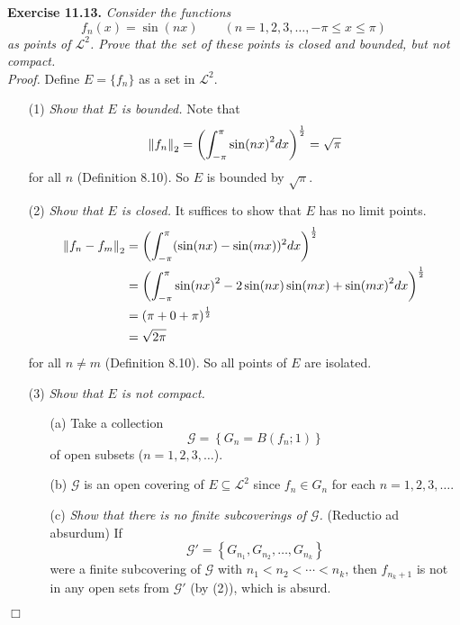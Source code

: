 \documentclass{article}
\begin{document}



\textbf{Exercise 11.13.}
\emph{Consider the functions
\[
  f_n(x) = \sin(nx)
  \qquad
  (n=1,2,3,\ldots, -\pi \leq x \leq \pi)
\]
as points of $\mathscr{L}^2$.
Prove that the set of these points is closed and bounded, but not compact.} \\


\emph{Proof.}
Define $E = \{ f_n \}$ as a set in $\mathscr{L}^2$.
\begin{enumerate}
\item[(1)]
  \emph{Show that $E$ is bounded.}
  Note that
  \[
    \norm{f_n}_2
    = \left( \int_{-\pi}^{\pi} \sin(nx)^2 dx \right)^{\frac{1}{2}}
    = \sqrt{\pi}
  \]
  for all $n$ (Definition 8.10).
  So $E$ is bounded by $\sqrt{\pi}$.

\item[(2)]
  \emph{Show that $E$ is closed.}
  It suffices to show that $E$ has no limit points.
  \begin{align*}
    \norm{f_n - f_m}_2
    &= \left( \int_{-\pi}^{\pi} (\sin(nx)-\sin(mx))^2 dx \right)^{\frac{1}{2}} \\
    &= \left( \int_{-\pi}^{\pi}
      \sin(nx)^2 - 2\sin(nx)\sin(mx) + \sin(mx)^2 dx \right)^{\frac{1}{2}} \\
    &= (\pi + 0 + \pi)^{\frac{1}{2}} \\
    &= \sqrt{2\pi}
  \end{align*}
  for all $n \neq m$ (Definition 8.10).
  So all points of $E$ are isolated.

\item[(3)]
  \emph{Show that $E$ is not compact.}
  \begin{enumerate}
  \item[(a)]
    Take a collection
    \[
      \mathscr{G} = \left\{ G_n = B\left(f_n;1\right) \right\}
    \]
    of open subsets ($n = 1,2,3,\ldots$).

  \item[(b)]
    $\mathscr{G}$ is an open covering of $E \subseteq \mathscr{L}^2$
    since $f_n \in G_n$ for each $n = 1,2,3,\ldots$.

  \item[(c)]
    \emph{Show that there is no finite subcoverings of $\mathscr{G}$.}
    (Reductio ad absurdum)
    If
    \[
      \mathscr{G}' = \left\{ G_{n_1}, G_{n_2}, \ldots, G_{n_k} \right\}
    \]
    were a finite subcovering of $\mathscr{G}$ with $n_1 < n_2 < \cdots < n_k$,
    then $f_{n_k+1}$ is not in any open sets from $\mathscr{G}'$ (by (2)),
    which is absurd.
  \end{enumerate}
\end{enumerate}
$\Box$ \\\\
\end{document}
